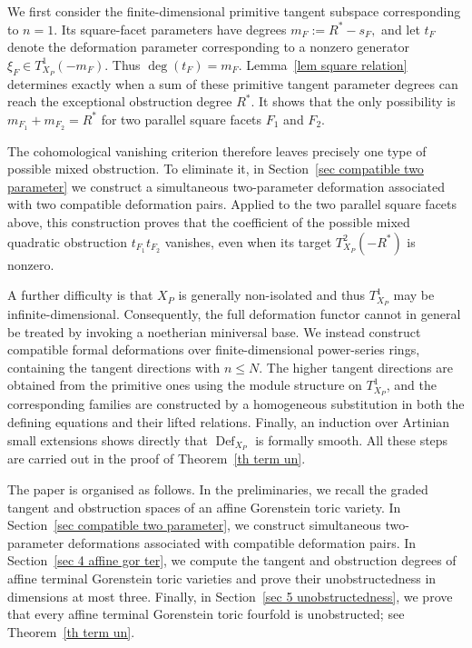 \documentclass[11pt]{amsart}
\numberwithin{equation}{section}
\theoremstyle{plain}
\theoremstyle{definition}
\newcommand{\0}{$0$-mutable}
\renewcommand{\1}{$1$-rigid}
\renewcommand{\0}{$0$-mutable}
\newcommand{\Def}{\operatorname{Def}}
\begin{document}
We first consider the finite-dimensional primitive tangent subspace
corresponding to \(n=1\). Its square-facet parameters have degrees
$
m_F:=R^*-s_F, 
$ 
and let \(t_F\) denote the deformation parameter corresponding to a nonzero generator $ \xi_F\in T^1_{X_P}(-m_F).$ Thus $\deg(t_F)=m_F.$
Lemma~\ref{lem square relation} determines exactly when a sum of these
primitive tangent parameter degrees can reach the exceptional
obstruction degree \(R^*\). It shows that the only possibility is
$
m_{F_1}+m_{F_2}=R^*
$
for two parallel square facets \(F_1\) and \(F_2\).

The cohomological vanishing criterion therefore leaves precisely one
type of possible mixed obstruction. To eliminate it, in
Section~\ref{sec compatible two parameter} we construct a simultaneous
two-parameter deformation associated with two compatible deformation
pairs. Applied to the two parallel square facets above, this
construction proves that the coefficient of the possible mixed
quadratic obstruction
$
t_{F_1}t_{F_2}
$
vanishes, even when its target
\(T^2_{X_P}(-R^*)\) is nonzero.

A further difficulty is that \(X_P\) is generally non-isolated and thus 
$
T^1_{X_P}
$
may be infinite-dimensional. Consequently, the full deformation
functor cannot in general be treated by invoking a noetherian
miniversal base. We instead construct compatible formal deformations
over finite-dimensional power-series rings, containing the tangent
directions with \(n\leq N\). The higher tangent directions are
obtained from the primitive ones using the 
module structure on \(T^1_{X_P}\), and the corresponding
families are constructed by a homogeneous substitution in both the
defining equations and their lifted relations. Finally, an induction
over Artinian small extensions shows directly that
\(\Def_{X_P}\) is formally smooth. All these steps are carried out in
the proof of Theorem~\ref{th term un}.


The paper is organised as follows. In the preliminaries, we recall the
graded tangent and obstruction spaces of an affine Gorenstein toric
variety. In Section~\ref{sec compatible two parameter}, we construct
simultaneous two-parameter deformations associated with compatible
deformation pairs. In Section~\ref{sec 4 affine gor ter}, we compute
the tangent and obstruction degrees of affine terminal Gorenstein toric
varieties and prove their unobstructedness in dimensions at most three.
Finally, in Section~\ref{sec 5 unobstructedness}, we prove that every
affine terminal Gorenstein toric fourfold is unobstructed; see
Theorem~\ref{th term un}.
\end{document}
